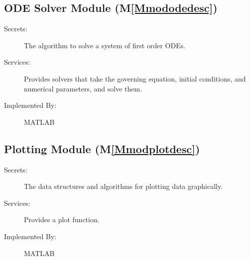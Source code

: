 \documentclass[12pt]{article}
\begin{document}
\subsection{ODE Solver Module (M\ref{Mmododedesc})}
\label{Sec:ODESolvModu()}
\begin{description}
\item[Secrets:]The algorithm to solve a system of first order ODEs.
\item[Services:]Provides solvers that take the governing equation, initial conditions, and numerical parameters, and solve them.
\item[Implemented By:]MATLAB
\end{description}
\subsection{Plotting Module (M\ref{Mmodplotdesc})}
\label{Sec:PlotModu()}
\begin{description}
\item[Secrets:]The data structures and algorithms for plotting data graphically.
\item[Services:]Provides a plot function.
\item[Implemented By:]MATLAB
\end{description}
\end{document}
